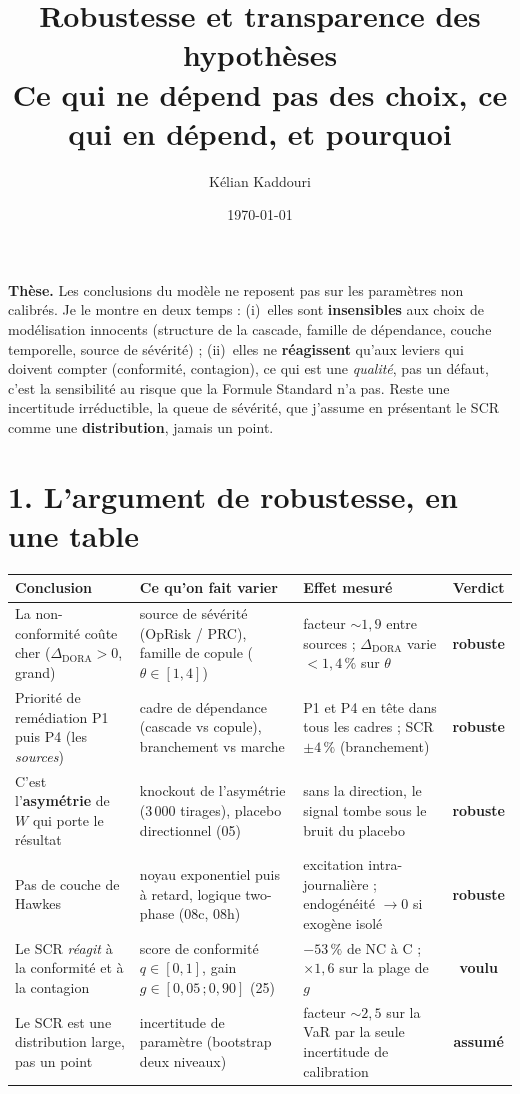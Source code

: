 \documentclass[11pt,a4paper]{article}
\title{\vspace{-1.3cm}\color{navy}\bfseries Robustesse et transparence des hypothèses\\[2pt]
  \large Ce qui ne dépend pas des choix, ce qui en dépend, et pourquoi}
\author{Kélian Kaddouri}
\date{\today}
\newcommand{\rob}{\cellcolor{softgreen}\textbf{robuste}}
\newcommand{\feat}{\cellcolor{lightblue!60}\textbf{voulu}}
\newcommand{\ass}{\cellcolor{softamber}\textbf{assumé}}
\begin{document}
\maketitle
\vspace{-0.7cm}

\begin{cle}
\textbf{Thèse.} Les conclusions du modèle ne reposent pas sur les paramètres non calibrés.
Je le montre en deux temps : (i)~elles sont \textbf{insensibles} aux choix de modélisation
innocents (structure de la cascade, famille de dépendance, couche temporelle, source de
sévérité) ; (ii)~elles ne \textbf{réagissent} qu'aux leviers qui doivent compter (conformité,
contagion), ce qui est une \emph{qualité}, pas un défaut, c'est la sensibilité au risque que
la Formule Standard n'a pas. Reste une incertitude irréductible, la queue de sévérité, que
j'assume en présentant le SCR comme une \textbf{distribution}, jamais un point.
\end{cle}

\section*{1. L'argument de robustesse, en une table}

\begin{center}\footnotesize
\renewcommand{\arraystretch}{1.3}
\begin{tabular}{@{}p{4.5cm} p{4.6cm} p{4.4cm} c@{}}
\toprule
\textbf{Conclusion} & \textbf{Ce qu'on fait varier} & \textbf{Effet mesuré} & \textbf{Verdict} \\
\midrule
La non-conformité coûte cher ($\Delta_{\text{DORA}}>0$, grand) &
source de sévérité (OpRisk / PRC), famille de copule ($\theta\in[1,4]$) &
facteur ${\sim}1{,}9$ entre sources ; $\Delta_{\text{DORA}}$ varie $<1{,}4\,\%$ sur $\theta$ &
\rob \\
Priorité de remédiation P1 puis P4 (les \emph{sources}) &
cadre de dépendance (cascade vs copule), branchement vs marche &
P1 et P4 en tête dans tous les cadres ; SCR $\pm 4\,\%$ (branchement) &
\rob \\
C'est l'\textbf{asymétrie} de $W$ qui porte le résultat &
knockout de l'asymétrie (3\,000 tirages), placebo directionnel (05) &
sans la direction, le signal tombe sous le bruit du placebo &
\rob \\
Pas de couche de Hawkes &
noyau exponentiel puis à retard, logique two-phase (08c, 08h) &
excitation intra-journalière ; endogénéité $\to 0$ si exogène isolé &
\rob \\
Le SCR \emph{réagit} à la conformité et à la contagion &
score de conformité $q\in[0,1]$, gain $g\in[0{,}05\,;0{,}90]$ (25) &
$-53\,\%$ de NC à C ; $\times 1{,}6$ sur la plage de $g$ &
\feat \\
Le SCR est une distribution large, pas un point &
incertitude de paramètre (bootstrap deux niveaux) &
facteur ${\sim}2{,}5$ sur la VaR par la seule incertitude de calibration &
\ass \\
\bottomrule
\end{tabular}
\end{center}
\end{document}
